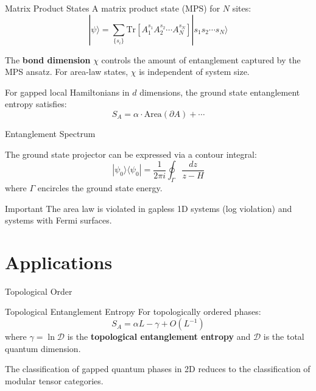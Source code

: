 \documentclass[aspectratio=169]{beamer}
\begin{document}
\begin{frame}{Matrix Product States}
  A matrix product state (MPS) for $N$ sites:
  \begin{equation}
    |\psi\rangle = \sum_{\{s_i\}} \mathrm{Tr}\left[A_1^{s_1} A_2^{s_2}
    \cdots A_N^{s_N}\right] |s_1 s_2 \cdots s_N\rangle
    \label{eq:mps}
  \end{equation}

  \begin{definition}
    The \textbf{bond dimension} $\chi$ controls the amount of entanglement
    captured by the MPS ansatz. For area-law states, $\chi$ is
    independent of system size.
  \end{definition}

  \begin{theorem}
    For gapped local Hamiltonians in $d$ dimensions, the ground state
    entanglement entropy satisfies:
    \begin{equation}
      S_A = \alpha\cdot\mathrm{Area}(\partial A) + \cdots
    \end{equation}
  \end{theorem}
\end{frame}

\begin{frame}{Entanglement Spectrum}
  \begin{proofblock}
    The ground state projector can be expressed via a contour integral:
    \begin{equation}
      |\psi_0\rangle\langle\psi_0| =
      \frac{1}{2\pi i} \oint_\Gamma \frac{dz}{z - H}
    \end{equation}
    where $\Gamma$ encircles the ground state energy.
  \end{proofblock}

  \begin{alertblock}{Important}
    The area law is violated in gapless 1D systems (log violation)
    and systems with Fermi surfaces.
  \end{alertblock}
\end{frame}

\section{Applications}

\begin{frame}{Topological Order}
  \begin{exampleblock}{Topological Entanglement Entropy}
    For topologically ordered phases:
    \begin{equation}
      S_A = \alpha L - \gamma + O(L^{-1})
    \end{equation}
    where $\gamma = \ln\mathcal{D}$ is the \textbf{topological
    entanglement entropy} and $\mathcal{D}$ is the total quantum
    dimension.
  \end{exampleblock}

  \begin{corollary}
    The classification of gapped quantum phases in 2D reduces to the
    classification of modular tensor categories.
  \end{corollary}
\end{frame}
\end{document}
